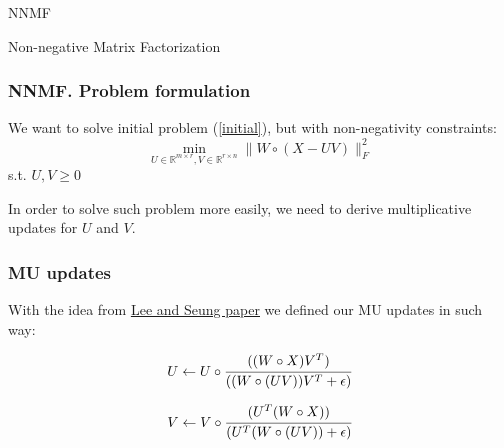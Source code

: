 \documentclass[pdf,10pt]{beamer}
\def\R{\mathbb{R}}
\begin{document}
\begin{section}{NNMF}

 \begin{subsection}{Non-negative Matrix Factorization}

   \begin{frame}
     \frametitle{NNMF. Problem formulation}

     We want to solve initial problem (\ref{initial}), but with non-negativity constraints:
     \begin{equation}
       \min_{U \in \R^{m\times r}, V \in \R^{r\times n}} \|W \circ (X - UV)\|^2_F
     \end{equation}
     s.t. $U, V \geq 0$

     In order to solve such problem more easily, we need to derive multiplicative updates for $U$ and $V$.

   \end{frame}

   \begin{frame}
     \frametitle{MU updates}

     With the idea from \href{https://proceedings.neurips.cc/paper_files/paper/2000/file/f9d1152547c0bde01830b7e8bd60024c-Paper.pdf}{\underline{Lee and Seung paper}} we defined our MU updates in such way:

     \begin{equation}
       U \leftarrow U \circ \cfrac{((W \circ X) V^T)}{((W \circ (UV)) V^T + \epsilon)}
     \end{equation}

     \begin{equation}
       V \leftarrow V \circ \cfrac{(U^T (W \circ X))}{(U^T (W \circ (UV)) + \epsilon)}
     \end{equation}

   \end{frame}

 \end{subsection}


\end{section}
\end{document}
